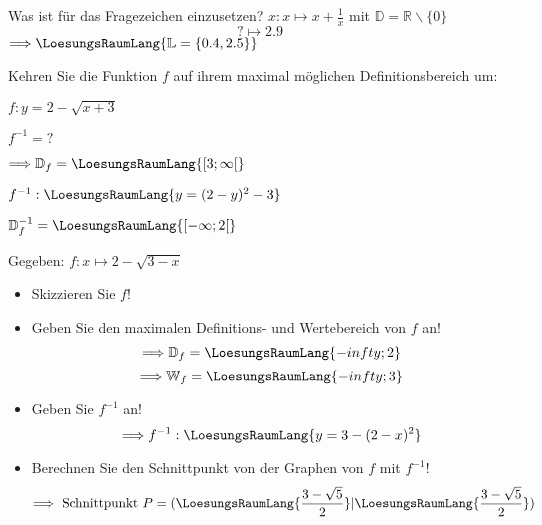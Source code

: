 \begin{bbwAufgabenBlock}
\item Was ist für das Fragezeichen einzusetzen? $x: x \mapsto x+\frac1x$ mit $\mathbb{D}
= \mathbb{R}\backslash \{0\}$
$$? \mapsto 2.9$$
$\Longrightarrow \LoesungsRaumLang{\mathbb{L} = \{0.4, 2.5\}}$

\item Kehren Sie die Funktion $f$ auf ihrem maximal möglichen
Definitionsbereich um:

$f: y=2-\sqrt{x+3}$

$f^{-1} = ?$


$\Longrightarrow \mathbb{D}_f = \LoesungsRaumLang{[3;\infty[}$

$f^{-1}: \LoesungsRaumLang{y = (2-y)^2 - 3}$

$\mathbb{D}_f^{-1} = \LoesungsRaumLang{[-\infty; 2[}$


\item Gegeben: $f: x\mapsto 2-\sqrt{3-x}$

\begin{itemize}
\item Skizzieren Sie $f$!
\item Geben Sie den maximalen Definitions- und Wertebereich von $f$ an!
  $$\Longrightarrow \mathbb{D}_f = \LoesungsRaumLang{-infty;2}$$
  $$\Longrightarrow \mathbb{W}_f = \LoesungsRaumLang{-infty;3}$$
\item Geben Sie $f^{-1}$ an!
  $$\Longrightarrow f^{-1}: \LoesungsRaumLang{y=3-(2-x)^2}$$
\item Berechnen Sie den Schnittpunkt von der Graphen von $f$ mit
$f^{-1}$!
  $$\Longrightarrow \textrm{ Schnittpunkt } P=(\LoesungsRaumLang{\frac{3-\sqrt{5}}2}|\LoesungsRaumLang{\frac{3-\sqrt{5}}2})$$

\end{itemize}
\end{bbwAufgabenBlock}

\platzFuerBerechnungenBisEndeSeite{}


\platzFuerBerechnungenBisEndeSeite{}



